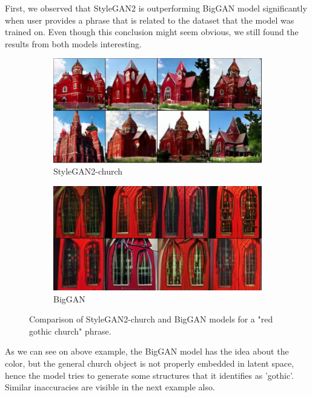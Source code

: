 \documentclass[12pt,a4paper,openany]{book}
\begin{document}
\noindent First, we observed that StyleGAN2 is outperforming BigGAN model significantly when user provides a phrase that is related to the dataset that the model was trained on. Even though this conclusion might seem obvious, we still found the results from both models interesting.

\begin{figure}[H]
\centering
\begin{subfigure}[b]{1.0\textwidth}
   \includegraphics[width=1\linewidth]{redgothic_stylegan.PNG}
   \caption{StyleGAN2-church}
   \label{fig:Ng1} 
\end{subfigure}

\begin{subfigure}[b]{1.0\textwidth}
   \includegraphics[width=1\linewidth]{redgothic_biggan.PNG}
   \caption{BigGAN}
   \label{fig:Ng2}
\end{subfigure}
\caption[pics]{Comparison of StyleGAN2-church and BigGAN models for a "red gothic church" phrase.}
\end{figure}

\noindent As we can see on above example, the BigGAN model has the idea about the color, but the general church object is not properly embedded in latent space, hence the model tries to generate some structures that it identifies as 'gothic'. Similar inaccuracies are visible in the next example also.
\end{document}
